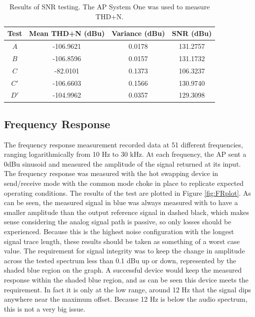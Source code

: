 \documentclass{article}
\begin{document}
	\begin{table}
	\begin{center}
	\begin{tabular}{ |c c c c| }
	\hline
	Test & Mean THD+N (dBu) & Variance (dBu) & SNR (dBu) \\ 
	 \hline
	$A$ & -106.9621   & 0.0178 	& 131.2757 \\
	$B$ & -106.8596   & 0.0157 	& 131.1732 \\
	$C$ &  -82.0101   & 0.1373  & 106.3237 \\
	$C'$ & -106.6603   & 0.1566 & 130.9740 \\
	$D'$ & -104.9962   & 0.0357 &  129.3098 \\
   	\hline
	\end{tabular}
	\caption{Results of SNR testing.  The AP System One was used to measure THD+N.}
	\label{tab:SNRresults}
	\end{center}
	\end{table}

	\subsection{Frequency Response}
	The frequency response measurement recorded data at 51 different frequencies, ranging logarithmically from 10 Hz to 30 kHz.  At each frequency, the AP sent a 0dBu sinusoid and measured the amplitude of the signal returned at its input.  The frequency response was measured with the hot swapping device in send/receive mode with the common mode choke in place to replicate expected operating conditions.  The results of the test are plotted in Figure \ref{fig:FRplot}.  As can be seen, the measured signal in blue was always measured with to have a smaller amplitude than the output reference signal in dashed black, which makes sense considering the analog signal path is passive, so only losses should be experienced.  Because this is the highest noise configuration with the longest signal trace length, these results should be taken as something of a worst case value.  The requirement for signal integrity was to keep the change in amplitude across the tested spectrum less than 0.1 dBu up or down, represented by the shaded blue region on the graph.  A successful device would keep the measured response within the shaded blue region, and as can be seen this device meets the requirement.  In fact it is only at the low range, around 12 Hz that the signal dips anywhere near the maximum offset.  Because 12 Hz is below the audio spectrum, this is not a very big issue.
\end{document}
